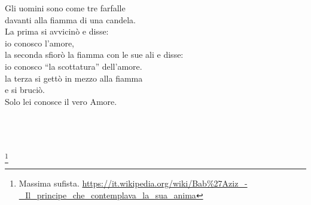 \begin{vcentered}
    \begin{poem}
Gli uomini sono come tre farfalle\\
davanti alla fiamma di una candela.\\
La prima si avvicinò e disse:\\
io conosco l'amore,\\
la seconda sfiorò la fiamma con le sue ali e disse:\\
io conosco ``la scottatura'' dell’amore.\\
la terza si gettò in mezzo alla fiamma\\
e si bruciò. \\
Solo lei conosce il vero Amore.\\
    \end{poem}
    \leavevmode\\
    \leavevmode\\
    \leavevmode\\
    \footnote{Massima sufista. \url{https://it.wikipedia.org/wiki/Bab\%27Aziz\_-\_Il\_principe\_che\_contemplava\_la\_sua\_anima}}
\end{vcentered}
